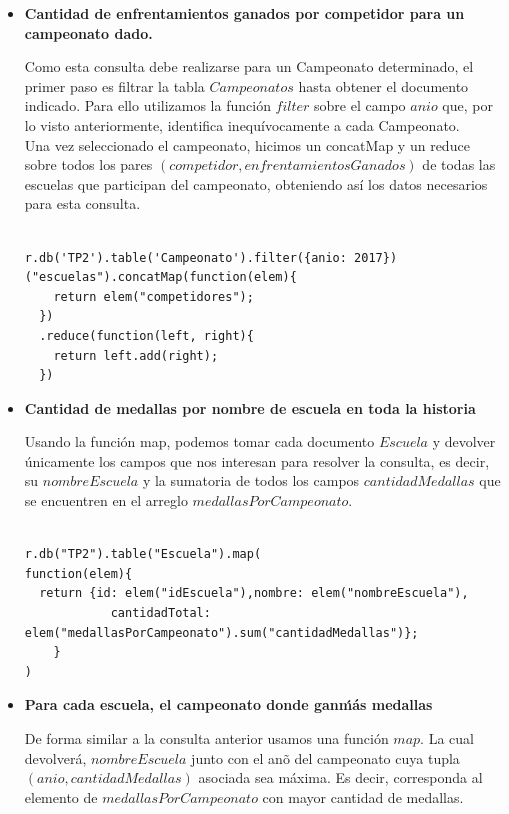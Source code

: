 \begin{itemize}

\item{\textbf{Cantidad de enfrentamientos ganados por competidor para un campeonato dado.}

Como esta consulta debe realizarse para un Campeonato determinado, el primer paso es filtrar la tabla $Campeonatos$ hasta obtener el documento indicado. Para ello utilizamos la función $filter$ sobre el campo $anio$ que, por lo visto anteriormente, identifica inequívocamente a cada Campeonato.\\

Una vez seleccionado el campeonato, hicimos un concatMap y un reduce sobre todos los pares $(competidor,enfrentamientosGanados)$ de todas las escuelas que participan del campeonato, obteniendo así los datos necesarios para esta consulta.

\begin{verbatim}

r.db('TP2').table('Campeonato').filter({anio: 2017})("escuelas").concatMap(function(elem){
  	return elem("competidores");
  })
  .reduce(function(left, right){
    return left.add(right);
  })

\end{verbatim}
}

\item{\textbf{Cantidad de medallas por nombre de escuela en toda la historia}

Usando la función map, podemos tomar cada documento $Escuela$ y devolver únicamente los campos que nos interesan para resolver la consulta, es decir, su $nombreEscuela$ y la sumatoria de todos los campos $cantidadMedallas$ que se encuentren en el arreglo $medallasPorCampeonato$.

\begin{verbatim}

r.db("TP2").table("Escuela").map(
function(elem){
  return {id: elem("idEscuela"),nombre: elem("nombreEscuela"),
    		cantidadTotal: elem("medallasPorCampeonato").sum("cantidadMedallas")};
	}
)

\end{verbatim}
}

\item{\textbf{Para cada escuela, el campeonato donde gan\' m\'as medallas}

De forma similar a la consulta anterior usamos una función $map$. La cual devolverá, $nombreEscuela$ junto con el an\~o del campeonato cuya tupla $(anio,cantidadMedallas)$ asociada sea máxima. Es decir, corresponda al elemento de $medallasPorCampeonato$ con mayor cantidad de medallas.

}
\end{itemize}
